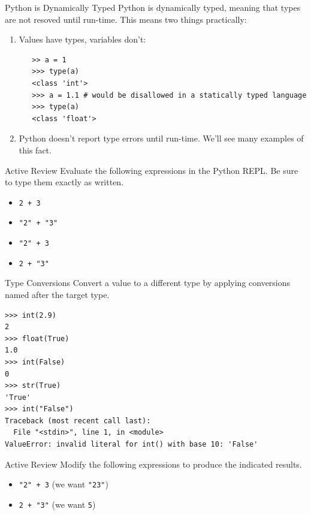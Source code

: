\documentclass[smaller, aspectratio=1610]{beamer}
\begin{document}
\begin{frame}[label={sec:org836ff06},fragile]{Python is Dynamically Typed}
 Python is dynamically typed, meaning that types are not resoved until run-time. This means two things practically:

\begin{enumerate}
\item Values have types, variables don't:
\lstset{language=Python,label= ,caption= ,captionpos=b,numbers=none}
\begin{lstlisting}
   >> a = 1
   >>> type(a)
   <class 'int'>
   >>> a = 1.1 # would be disallowed in a statically typed language
   >>> type(a)
   <class 'float'>
\end{lstlisting}
\item Python doesn't report type errors until run-time. We'll see many examples of this fact.
\end{enumerate}

\begin{block}{Active Review}
Evaluate the following expressions in the Python REPL.  Be sure to type them exactly as written.

\begin{itemize}
\item \texttt{2 + 3}
\item \texttt{"2" + "3"}
\item \texttt{"2" + 3}
\item \texttt{2 + "3"}
\end{itemize}
\end{block}
\end{frame}

\begin{frame}[label={sec:org555a2d7},fragile]{Type Conversions}
 Convert a value to a different type by applying conversions named after the target type.

\lstset{language=Python,label= ,caption= ,captionpos=b,numbers=none}
\begin{lstlisting}
>>> int(2.9)
2
>>> float(True)
1.0
>>> int(False)
0
>>> str(True)
'True'
>>> int("False")
Traceback (most recent call last):
  File "<stdin>", line 1, in <module>
ValueError: invalid literal for int() with base 10: 'False'
\end{lstlisting}

\begin{block}{Active Review}
Modify the following expressions to produce the indicated results.

\begin{itemize}
\item \texttt{"2" + 3} (we want \texttt{"23"})
\item \texttt{2 + "3"} (we want \texttt{5})
\end{itemize}
\end{block}
\end{frame}
\end{document}
